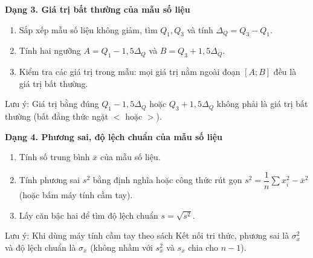 \textbf{Dạng 3. Giá trị bất thường của mẫu số liệu}
\begin{enumerate}
\item Sắp xếp mẫu số liệu không giảm, tìm $Q_1, Q_3$ và tính $\Delta_Q = Q_3 - Q_1$.
\item Tính hai ngưỡng $A = Q_1 - 1{,}5\Delta_Q$ và $B = Q_3 + 1{,}5\Delta_Q$.
\item Kiểm tra các giá trị trong mẫu: mọi giá trị nằm ngoài đoạn $[A; B]$ đều là giá trị bất thường.
\end{enumerate}
Lưu ý: Giá trị bằng đúng $Q_1 - 1{,}5\Delta_Q$ hoặc $Q_3 + 1{,}5\Delta_Q$ không phải là giá trị bất thường (bất đẳng thức ngặt $<$ hoặc $>$).

\textbf{Dạng 4. Phương sai, độ lệch chuẩn của mẫu số liệu}
\begin{enumerate}
\item Tính số trung bình $\overline{x}$ của mẫu số liệu.
\item Tính phương sai $s^2$ bằng định nghĩa hoặc công thức rút gọn $s^2 = \dfrac{1}{n}\sum x_i^2 - \overline{x}^2$ (hoặc bấm máy tính cầm tay).
\item Lấy căn bậc hai để tìm độ lệch chuẩn $s = \sqrt{s^2}$.
\end{enumerate}
Lưu ý: Khi dùng máy tính cầm tay theo sách Kết nối tri thức, phương sai là $\sigma_x^2$ và độ lệch chuẩn là $\sigma_x$ (không nhầm với $s_x^2$ và $s_x$ chia cho $n-1$).
